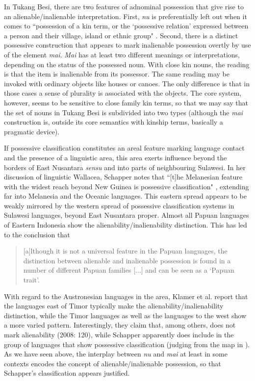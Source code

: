 In Tukang Besi, there are two features of adnominal possession that give rise to an alienable/inalienable interpretation. First, \textit{nu} is preferentially left out when it comes to ``possession of a kin term, or the `possessive relation' expressed between a person and their village, island or ethnic group" \citep[346]{donohue1999}. Second, there is a distinct possessive construction that appears to mark inalienable possession overtly by use of the element \textit{mai}. \textit{Mai} has at least two different meanings or interpretations, depending on the status of the possessed noun. With close kin nouns, the reading is that the item is inalienable from its possessor. The same reading may be invoked with ordinary objects like houses or canoes. The only difference is that in those cases a sense of plurality is associated with the objects. The core system, however, seems to be sensitive to close family kin terms, so that we may say that the set of nouns in Tukang Besi is subdivided into two types (although the \textit{mai} construction is, outside its core semantics with kinship terms, basically a pragmatic device). 

If possessive classification constitutes an areal feature marking language contact and the presence of a linguistic area, this area exerts influence beyond the borders of East Nusantara \textit{sensu} \citet{klamer2008east} and into parts of neighbouring Sulawesi. In her discussion of linguistic Wallacea, Schapper notes that ``[t]he Melanesian feature with the widest reach beyond New Guinea is possessive classification" \citep[108]{schapper2015wallacea}, extending far into Melanesia and the Oceanic languages. This eastern spread appears to be weakly mirrored by the western spread of possessive classification systems in Sulawesi languages, beyond East Nusantara proper. Almost all Papuan languages of Eastern Indonesia show the alienability/inalienability distinction. This has led \citet[120]{klamer2008east} to the conclusion that

\begin{quote}[a]lthough it is not a universal feature in the Papuan languages,
the distinction between alienable and inalienable possession is found in a number of different Papuan families [...] and can be seen as a `Papuan trait’.\end{quote}

With regard to the Austronesian languages in the area, Klamer et al. report that the languages east of Timor typically make the alienability/inalienability distinction, while the Timor languages as well as the languages to the west show a more varied pattern. Interestingly, they claim that, among others,  does not mark alienability (2008: 120), while Schapper apparently does include  in the group of languages that show possessive classification (judging from the map in \citealt[110]{schapper2009bunaq}). As we have seen above, the interplay between \textit{nu} and \textit{mai} at least in some contexts encodes the concept of alienable/inalienable possession, so that Schapper's classification appears justified.


